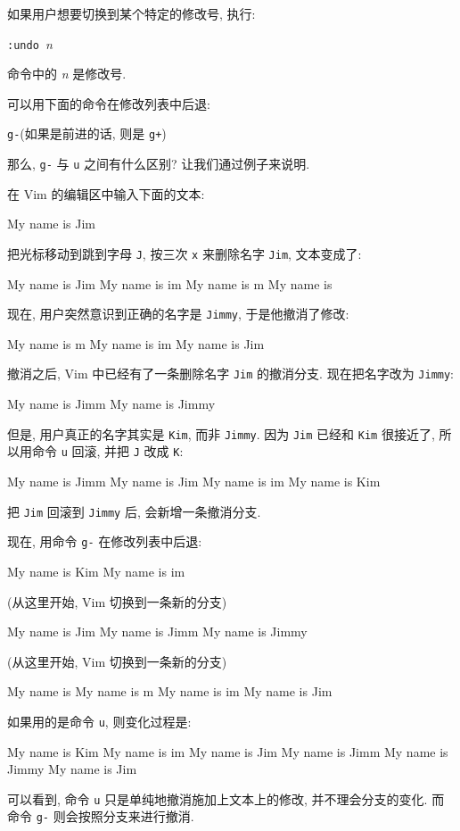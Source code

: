 如果用户想要切换到某个特定的修改号, 执行:
\begin{vimcmdform}
\texttt{:undo }\textit{n}
\end{vimcmdform}
命令中的 \textit{n} 是修改号.

可以用下面的命令在修改列表中后退:
\begin{vimcmdform}
    \texttt{g-}(如果是前进的话, 则是 \texttt{g+})
\end{vimcmdform}

那么, \texttt{g-} 与 \texttt{u} 之间有什么区别? 让我们通过例子来说明.

在 Vim 的编辑区中输入下面的文本:
\begin{vimcode}
My name is Jim
\end{vimcode}
把光标移动到跳到字母 \texttt{J}, 按三次 \texttt{x} 来删除名字 \texttt{Jim},
文本变成了:
\begin{vimcode}
My name is Jim
My name is im
My name is m
My name is 
\end{vimcode}
现在, 用户突然意识到正确的名字是 \texttt{Jimmy}, 于是他撤消了修改:
\begin{vimcode}
My name is m
My name is im
My name is Jim
\end{vimcode}
撤消之后, Vim 中已经有了一条删除名字 \texttt{Jim} 的撤消分支. 现在把名字改为
\texttt{Jimmy}:
\begin{vimcode}
My name is Jimm
My name is Jimmy
\end{vimcode}
但是, 用户真正的名字其实是 \texttt{Kim}, 而非 \texttt{Jimmy}. 因为 \texttt{Jim}
已经和 \texttt{Kim} 很接近了, 所以用命令 \texttt{u} 回滚, 并把 \texttt{J} 改成
\texttt{K}:
\begin{vimcode}
My name is Jimm
My name is Jim
My name is im
My name is Kim
\end{vimcode}
把 \texttt{Jim} 回滚到 \texttt{Jimmy} 后, 会新增一条撤消分支.

现在, 用命令 \texttt{g-} 在修改列表中后退:
\begin{vimcode}
My name is Kim
My name is im
\end{vimcode}
(从这里开始, Vim 切换到一条新的分支)
\begin{vimcode}
My name is Jim
My name is Jimm
My name is Jimmy
\end{vimcode}
(从这里开始, Vim 切换到一条新的分支)
\begin{vimcode}
My name is 
My name is m
My name is im
My name is Jim
\end{vimcode}
如果用的是命令 \texttt{u}, 则变化过程是:
\begin{vimcode}
My name is Kim
My name is im
My name is Jim
My name is Jimm
My name is Jimmy
My name is Jim
\end{vimcode}
可以看到, 命令 \texttt{u} 只是单纯地撤消施加上文本上的修改, 并不理会分支的变化.
而命令 \texttt{g-} 则会按照分支来进行撤消.

